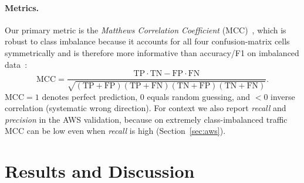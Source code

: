 \documentclass[preprint,12pt,authoryear]{elsarticle}
\begin{document}
\paragraph{Metrics.} Our primary metric is the \emph{Matthews Correlation
Coefficient} (MCC)~\citep{matthews}, which is robust to class imbalance because it
accounts for all four confusion-matrix cells symmetrically and is therefore more
informative than accuracy/F1 on imbalanced data~\citep{chicco}:
\begin{equation}
\mathrm{MCC} = \frac{\mathrm{TP}\cdot\mathrm{TN} - \mathrm{FP}\cdot\mathrm{FN}}
{\sqrt{(\mathrm{TP}{+}\mathrm{FP})(\mathrm{TP}{+}\mathrm{FN})
(\mathrm{TN}{+}\mathrm{FP})(\mathrm{TN}{+}\mathrm{FN})}}.
\end{equation}
$\mathrm{MCC}=1$ denotes perfect prediction, $0$ equals random guessing, and $<0$
inverse correlation (systematic wrong direction). For context we also report
\emph{recall} and \emph{precision} in the AWS validation, because on extremely
class-imbalanced traffic MCC can be low even when \emph{recall} is high
(Section~\ref{sec:aws}).

\section{Results and Discussion}
\label{sec:hasil}
\end{document}
